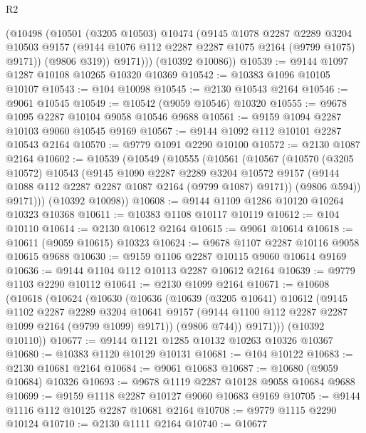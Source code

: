 \begin{lexlean}{R2}
\begin{coremodule}
          (@10498
            (@10501
              (@3205 @10503)
              @10474
              (@9145
                @1078
                @2287
                @2289
                @3204
                @10503
                @9157
                (@9144 @1076 @112 @2287 @2287 @1075 @2164 (@9799 @1075) @9171))
              (@9806 @319))
            @9171)))
      (@10392 @10086))
@10539 := @9144 @1097 @1287 @10108 @10265 @10320 @10369
@10542 := @10383 @1096 @10105 @10107
@10543 := @104 @10098
@10545 := @2130 @10543 @2164
@10546 := @9061 @10545
@10549 := @10542 (@9059 @10546) @10320
@10555 := @9678 @1095 @2287 @10104 @9058 @10546 @9688
@10561 := @9159 @1094 @2287 @10103 @9060 @10545 @9169
@10567 := @9144 @1092 @112 @10101 @2287 @10543 @2164
@10570 := @9779 @1091 @2290 @10100
@10572 := @2130 @1087 @2164
@10602 := @10539
    (@10549
      (@10555
        (@10561
          (@10567
            (@10570
              (@3205 @10572)
              @10543
              (@9145
                @1090
                @2287
                @2289
                @3204
                @10572
                @9157
                (@9144 @1088 @112 @2287 @2287 @1087 @2164 (@9799 @1087) @9171))
              (@9806 @594))
            @9171)))
      (@10392 @10098))
@10608 := @9144 @1109 @1286 @10120 @10264 @10323 @10368
@10611 := @10383 @1108 @10117 @10119
@10612 := @104 @10110
@10614 := @2130 @10612 @2164
@10615 := @9061 @10614
@10618 := @10611 (@9059 @10615) @10323
@10624 := @9678 @1107 @2287 @10116 @9058 @10615 @9688
@10630 := @9159 @1106 @2287 @10115 @9060 @10614 @9169
@10636 := @9144 @1104 @112 @10113 @2287 @10612 @2164
@10639 := @9779 @1103 @2290 @10112
@10641 := @2130 @1099 @2164
@10671 := @10608
    (@10618
      (@10624
        (@10630
          (@10636
            (@10639
              (@3205 @10641)
              @10612
              (@9145
                @1102
                @2287
                @2289
                @3204
                @10641
                @9157
                (@9144 @1100 @112 @2287 @2287 @1099 @2164 (@9799 @1099) @9171))
              (@9806 @744))
            @9171)))
      (@10392 @10110))
@10677 := @9144 @1121 @1285 @10132 @10263 @10326 @10367
@10680 := @10383 @1120 @10129 @10131
@10681 := @104 @10122
@10683 := @2130 @10681 @2164
@10684 := @9061 @10683
@10687 := @10680 (@9059 @10684) @10326
@10693 := @9678 @1119 @2287 @10128 @9058 @10684 @9688
@10699 := @9159 @1118 @2287 @10127 @9060 @10683 @9169
@10705 := @9144 @1116 @112 @10125 @2287 @10681 @2164
@10708 := @9779 @1115 @2290 @10124
@10710 := @2130 @1111 @2164
@10740 := @10677

\end{coremodule}
\end{lexlean}
